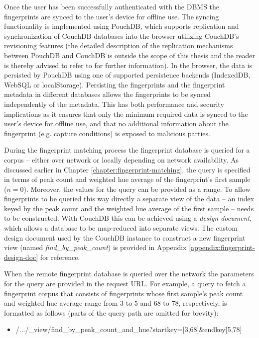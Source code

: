 \documentclass[thesis.tex]{subfiles}
\begin{document}
Once the user has been successfully authenticated with the DBMS the fingerprints are synced to the user's device for offline use. The syncing functionality is implemented using PouchDB, which supports replication and synchronization of CouchDB databases into the browser utilizing CouchDB's revisioning features (the detailed description of the replication mechanisms between PouchDB and CouchDB is outside the scope of this thesis and the reader is thereby advised to refer to \cite{pouch-couch-replication} for further information). In the browser, the data is persisted by PouchDB using one of supported persistence backends (IndexedDB, WebSQL or localStorage). Persisting the fingerprints and the fingerprint metadata in different databases allows the fingerprints to be synced independently of the metadata. This has both performance and security implications as it ensures that only the minimum required data is synced to the user's device for offline use, and that no additional information about the fingerprint (e.g. capture conditions) is exposed to malicious parties.

During the fingerprint matching process the fingerprint database is queried for a corpus -- either over network or locally depending on network availability. As discussed earlier in Chapter \ref{chapter:fingerprint-matching}, the query is specified in terms of peak count and weighted hue average of the fingerprint's first sample ($n=0$). Moreover, the values for the query can be provided as a range. To allow fingerprints to be queried this way directly a separate view of the data -- an index keyed by the peak count and the weighted hue average of the first sample -- needs to be constructed. With CouchDB this can be achieved using a \emph{design document}, which allows a database to be map-reduced into separate views. The custom design document used by the CouchDB instance to construct a new fingerprint view (named \emph{find\_by\_peak\_count}) is provided in Appendix \ref{appendix:fingerprint-design-doc} for reference.

When the remote fingerprint database is queried over the network the parameters for the query are provided in the request URL. For example, a query to fetch a fingerprint corpus that consists of fingerprints whose first sample's peak count and weighted hue average range from 3 to 5 and 68 to 78, respectively, is formatted as follows (parts of the query path are omitted for brevity):

\begin{itemize}[label=]
	\item /.../\_view/find\_by\_peak\_count\_and\_hue?startkey=[3,68]\&endkey\=[5,78]
\end{itemize}
\end{document}

